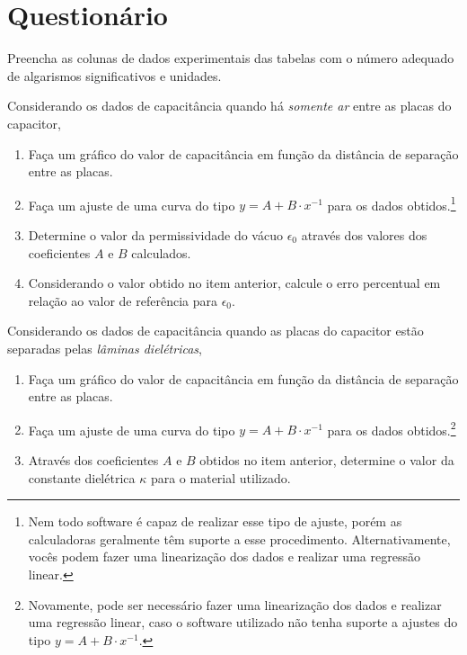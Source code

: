 \vspace{5mm}

\section{Questionário}

\begin{question}[type={exam}]{2}
Preencha as colunas de dados experimentais das tabelas com o número adequado de algarismos significativos e unidades.
\end{question}

\begin{question}[type={exam}]{4} Considerando os dados de capacitância quando há \emph{somente ar} entre as placas do capacitor,
\begin{enumerate}[label=\roman*.]
    \item Faça um gráfico do valor de capacitância em função da distância de separação entre as placas.
    \item Faça um ajuste de uma curva do tipo $y = A + B \cdot x^{-1}$ para os dados obtidos.\footnote{Nem todo software é capaz de realizar esse tipo de ajuste, porém as calculadoras geralmente têm suporte a esse procedimento. Alternativamente, vocês podem fazer uma linearização dos dados e realizar uma regressão linear.} 
    \item Determine o valor da permissividade do vácuo $\epsilon_0$ através dos valores dos  coeficientes $A$ e $B$ calculados.
    \item Considerando o valor obtido no item anterior, calcule o erro percentual em relação ao valor de referência para $\epsilon_0$.
\end{enumerate}
\end{question}

\begin{question}[type={exam}]{4}
Considerando os dados de capacitância quando as placas do capacitor estão separadas pelas \emph{lâminas dielétricas},
\begin{enumerate}[label=\roman*.]
    \item Faça um gráfico do valor de capacitância em função da distância de separação entre as placas.
    \item Faça um ajuste de uma curva do tipo $y = A + B \cdot x^{-1}$ para os dados obtidos.\footnote{Novamente, pode ser necessário fazer uma linearização dos dados e realizar uma regressão linear, caso o software utilizado não tenha suporte a ajustes do tipo $y = A + B \cdot x^{-1}$.} 
    \item Através dos coeficientes $A$ e $B$ obtidos no item anterior, determine o valor da constante dielétrica $\kappa$ para o material utilizado. 
\end{enumerate}
\end{question}

